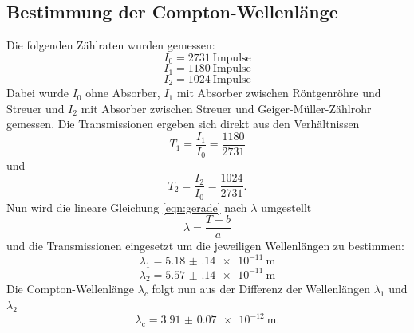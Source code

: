 \subsection{Bestimmung der Compton-Wellenlänge}
Die folgenden Zählraten wurden gemessen:
\begin{equation*}
    I_0 = \SI{2731}{\text{Impulse}}
\end{equation*}
\begin{equation*}
    I_1 = \SI{1180}{\text{Impulse}}
\end{equation*}
\begin{equation*}
    I_2 = \SI{1024}{\text{Impulse}}
\end{equation*}
Dabei wurde $I_0$ ohne Absorber, $I_1$ mit Absorber zwischen Röntgenröhre und Streuer und $I_2$ mit Absorber zwischen Streuer und Geiger-Müller-Zählrohr gemessen.
Die Transmissionen ergeben sich direkt aus den Verhältnissen
\begin{equation*}
    T_1 = \frac{I_1}{I_0} = \frac{1180}{2731}
\end{equation*}
und
\begin{equation*}
    T_2 = \frac{I_2}{I_0} = \frac{1024}{2731} .
\end{equation*}
Nun wird die lineare Gleichung \ref{eqn:gerade} nach $\lambda$ umgestellt
\begin{equation}
    \lambda = \frac{T - b}{a}
\end{equation}
und die Transmissionen eingesetzt um die jeweiligen Wellenlängen zu bestimmen:
\begin{equation*}
    \lambda_1 = \SI{5.18(14)e-11}{\metre}
\end{equation*}
\begin{equation*}
    \lambda_2 = \SI{5.57(14)e-11}{\metre}
\end{equation*}
Die Compton-Wellenlänge $\lambda_c$ folgt nun aus der Differenz der Wellenlängen $\lambda_1$ und $\lambda_2$
\begin{equation}
    \lambda_\text{c} = \SI{3.91(7)e-12}{\metre} .
    \label{eqn:lambdac}
\end{equation}